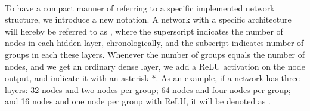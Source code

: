 \\
To have a compact manner of referring to a specific implemented network structure, we introduce a new notation. A network with a specific architecture will hereby be referred to as , where the superscript indicates the number of nodes in each hidden layer, chronologically, and the subscript indicates number of groups in each these layers. Whenever the number of groups equals the number of nodes, and we get an ordinary dense layer, we add a ReLU activation on the node output, and indicate it with an asterisk $*$. As an example, if a network has three layers: 32 nodes and two nodes per group; 64 nodes and four nodes per group; and 16 nodes and one node per group with ReLU, it will be denoted as . 



